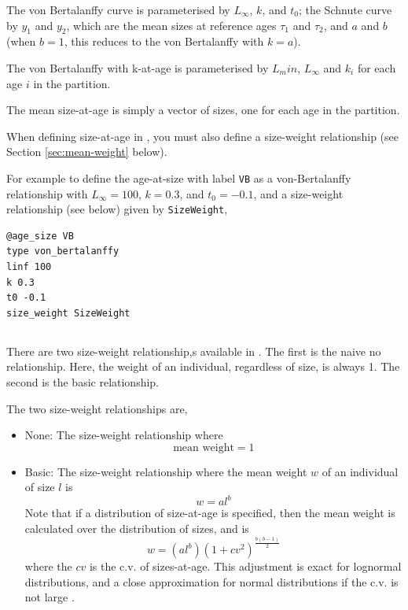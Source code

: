 The von Bertalanffy curve is parameterised by $L_\infty$, $k$, and $t_0$; the Schnute curve \citep{836} by $y_1$ and $y_2$, which are the mean sizes at reference ages $\tau_1$ and $\tau_2$, and $a$ and $b$ (when $b=1$, this reduces to the von Bertalanffy with $k=a$). 

The von Bertalanffy with k-at-age is parameterised by $L_min$, $L_\infty$ and $k_i$ for each age $i$ in the partition.

The mean size-at-age is simply a vector of sizes, one for each age in the partition.

When defining size-at-age in \SPM, you must also define a size-weight relationship (see Section \ref{sec:mean-weight} below).

For example to define the age-at-size with label \texttt{VB} as a von-Bertalanffy relationship with $L_\infty=100$, $k=0.3$, and $t_0=-0.1$, and a size-weight relationship (see below) given by \texttt{SizeWeight},

{\small{\begin{verbatim}
@age_size VB
type von_bertalanffy
linf 100
k 0.3
t0 -0.1
size_weight SizeWeight
\end{verbatim}}}

\subsection{\label{sec:mean-weight}}

There are two size-weight relationship,s available in \SPM. The first is the naive no relationship. Here, the weight of an individual, regardless of size, is always 1. The second is the basic relationship. 

The two size-weight relationships are,

\begin{itemize}
  \item{None:} The size-weight relationship where  
  \begin{equation}
    \text{mean weight}=1
  \end{equation}
  \item{Basic:} The size-weight relationship where the mean weight $w$ of an individual of size $l$ is
  \begin{equation}
    w=a l^b
  \end{equation}
	Note that if a distribution of size-at-age is specified, then the mean weight is calculated over the distribution of sizes, and is
  \begin{equation}
	  w=(al^b)(1+cv^2)^{\frac{b(b-1)}{2}}
  \end{equation}
	where the $cv$ is the c.v. of sizes-at-age. This adjustment is exact for lognormal distributions, and a close approximation for normal distributions if the c.v. is not large \citep{1388}.
\end{itemize}

